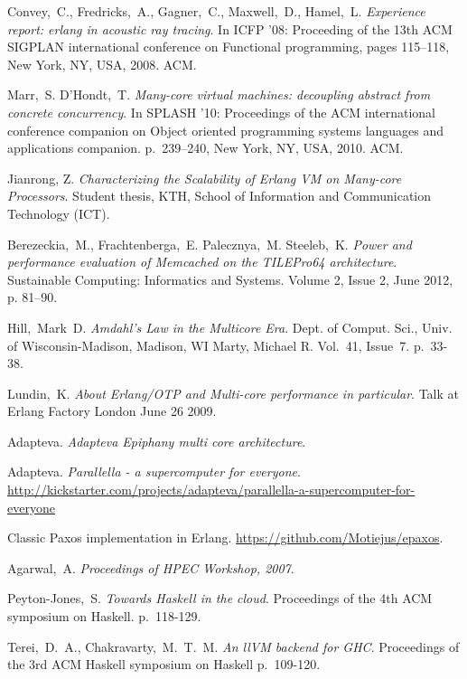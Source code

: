 \documentclass[english,11pt]{l4proj}
\begin{document}
\begin{thebibliography}{99}
     Convey,~C., Fredricks,~A., Gagner,~C.,
        Maxwell,~D., Hamel,~L. \emph{Experience report: erlang in acoustic ray
        tracing}. In ICFP ’08: Proceeding of the 13th ACM SIGPLAN international
        conference on Functional programming, pages 115–118, New York, NY, USA,
        2008. ACM.

     Marr,~S. D’Hondt,~T. \emph{Many-core virtual machines:
        decoupling abstract from concrete concurrency}. In SPLASH ’10:
        Proceedings of the ACM international conference companion on Object
        oriented programming systems languages and applications companion.
        p.~239–240, New York, NY, USA, 2010. ACM.

     Jianrong, Z. \emph{Characterizing the
        Scalability of Erlang VM on Many-core Processors}. Student thesis, KTH,
        School of Information and Communication Technology (ICT).

     Berezeckia,~M., Frachtenberga,~E. Palecznya,~M.
        Steeleb,~K. \emph{Power and performance evaluation of Memcached on the
        TILEPro64 architecture}. Sustainable Computing: Informatics and Systems.
        Volume 2, Issue 2, June 2012, p. 81–90.

     Hill,~Mark~D. \emph{Amdahl's Law in the Multicore
        Era}. Dept. of Comput. Sci., Univ. of Wisconsin-Madison, Madison, WI
        Marty, Michael R.  Vol.~41, Issue~7. p.~33-38.

     Lundin,~K. \emph{About Erlang/OTP and Multi-core
        performance in particular}. Talk at Erlang Factory London June 26 2009.

     Adapteva. \emph{Adapteva Epiphany multi core
    architecture}.

     Adapteva. \emph{Parallella - a
    supercomputer for everyone}. {\small \url{
http://kickstarter.com/projects/adapteva/parallella-a-supercomputer-for-everyone
}}

     Classic Paxos implementation in Erlang. {\small \url{
    https://github.com/Motiejus/epaxos}}.

     Agarwal,~A. \emph{Proceedings of HPEC Workshop,
    2007}.

     Peyton-Jones,~S. \emph{Towards Haskell in the
    cloud}. Proceedings of the 4th ACM symposium on Haskell. p.~118-129.

     Terei,~D.~A., Chakravarty,~M.~T.~M. \emph{An llVM
    backend for GHC}. Proceedings of the 3rd ACM Haskell symposium on Haskell
    p.~109-120.

\end{thebibliography}

\educationalconsent
\end{document}
